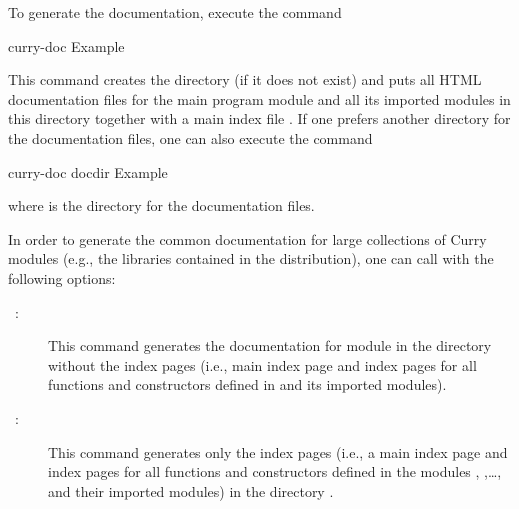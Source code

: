 To generate the documentation, execute the command
\begin{curry}
curry-doc Example
\end{curry}
This command creates the directory  (if it does not exist)
and puts all HTML documentation files for the main program module
and all its imported modules in this directory together with
a main index file .
If one prefers another directory for the documentation files,
one can also execute the command
\begin{curry}
curry-doc docdir Example
\end{curry}
where  is the directory for the documentation files.

In order to generate the common documentation for large collections
of Curry modules (e.g., the libraries contained in the \CYS distribution),
one can call  with the following options:
\begin{description}
\item[~:]
This command generates the documentation for module 
in the directory  without the index pages (i.e., main index page
and index pages for all functions and constructors defined in 
and its imported modules).
\item[~:]
This command generates only the index pages (i.e., a main index page
and index pages for all functions and constructors defined in the modules
, ,\ldots, and their imported modules)
in the directory .
\end{description}

